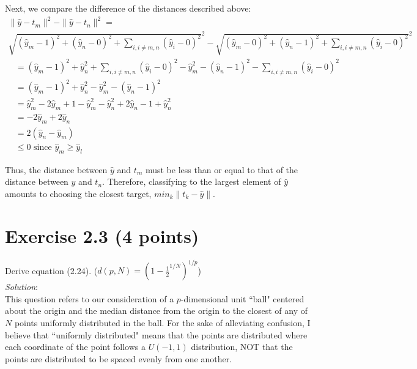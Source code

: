 \documentclass{article}
\begin{document}
Next, we compare the difference of the distances described above:
\begin{multline*}
 \|\hat{y} - t_{m}\|^{2} - \|\hat{y} - t_{n}\|^{2} =\\
   \sqrt{ (\hat{y}_{m} - 1)^{2} + (\hat{y}_{n} - 0)^{2} + \sum_{i, i \neq m, n}{(\hat{y}_{i} - 0)^{2}} }^{2} -
    \sqrt{ (\hat{y}_{m} - 0)^{2} + (\hat{y}_{n} - 1)^{2} + \sum_{i, i \neq m, n}{(\hat{y}_{i} - 0)^{2}} }^{2}
\end{multline*}
\begin{align*}
   &=  (\hat{y}_{m} - 1)^{2} + \hat{y}_{n}^{2}       + \sum_{i, i \neq m, n}{(\hat{y}_{i} - 0)^{2}} -
       \hat{y}_{m}^{2}       - (\hat{y}_{n} - 1)^{2} - \sum_{i, i \neq m, n}{(\hat{y}_{i} - 0)^{2}}\\
   &=  (\hat{y}_{m} - 1)^{2} + \hat{y}_{n}^{2} - \hat{y}_{m}^{2} - (\hat{y}_{n} - 1)^{2}\\
   &=  \hat{y}_{m}^{2} - 2\hat{y}_{m} + 1 - \hat{y}_{m}^{2} - \hat{y}_{n}^{2} + 2\hat{y}_{n} - 1 + \hat{y}_{n}^{2}\\
   &=  -2\hat{y}_{m} + 2\hat{y}_{n}\\
   &=  2(\hat{y}_{n} - \hat{y}_{m})\\
   &\le 0 \text{ since }\hat{y}_{m} \ge \hat{y}_{l}
\end{align*}

Thus, the distance between $\hat{y}$ and $t_{m}$ must be less than or equal to that of the distance between $\hat{y}$ and $t_{n}$. Therefore, classifying to the largest element of $\hat{y}$ amounts to choosing the closest target, $min_{k} \|t_{k} - \hat{y}\|$.\\
\newpage
\section{Exercise 2.3 (4 points)}
Derive equation (2.24). ($d(p, N) = (1 - \frac{1}{2}^{1/N})^{1/p}$)\\

\textit{Solution}:\\
This question refers to our consideration of a $p$-dimensional unit ``ball" centered about the origin and the median distance from the origin to the closest of any of $N$ points uniformly distributed in the ball. For the sake of alleviating confusion, I believe that ``uniformly distributed" means that the points are distributed where each coordinate of the point follows a $U(-1, 1)$ distribution, NOT that the points are distributed to be spaced evenly from one another.
\end{document}
